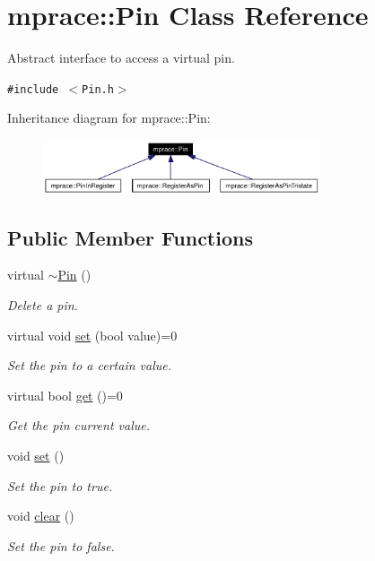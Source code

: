 \hypertarget{classmprace_1_1Pin}{
\section{mprace::Pin Class Reference}
\label{classmprace_1_1Pin}
}
Abstract interface to access a virtual pin.  


{\tt \#include $<$Pin.h$>$}

Inheritance diagram for mprace::Pin:\begin{figure}[H]
\begin{center}
\leavevmode
\includegraphics[width=232pt]{classmprace_1_1Pin__inherit__graph}
\end{center}
\end{figure}
\subsection*{Public Member Functions}
\begin{CompactItemize}
\item 
virtual \hyperlink{classmprace_1_1Pin_a0}{$\sim$Pin} ()
\begin{CompactList}\small\item\em Delete a pin. \item\end{CompactList}\item 
virtual void \hyperlink{classmprace_1_1Pin_a1}{set} (bool value)=0
\begin{CompactList}\small\item\em Set the pin to a certain value. \item\end{CompactList}\item 
virtual bool \hyperlink{classmprace_1_1Pin_a2}{get} ()=0
\begin{CompactList}\small\item\em Get the pin current value. \item\end{CompactList}\item 
void \hyperlink{classmprace_1_1Pin_a3}{set} ()
\begin{CompactList}\small\item\em Set the pin to true. \item\end{CompactList}\item 
void \hyperlink{classmprace_1_1Pin_a4}{clear} ()
\begin{CompactList}\small\item\em Set the pin to false. \item\end{CompactList}\end{CompactItemize}
